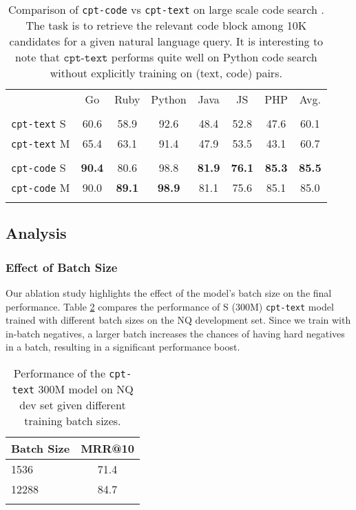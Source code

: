 \documentclass[nohyperref]{article}
\begin{document}
\begin{table}[]
\small
\setlength{\tabcolsep}{4pt}
\centering
\tabcolsep=0.11cm
\begin{tabular}{lccccccc}
 & Go & Ruby & Python & Java & JS & PHP & Avg. \\ 
\Xhline{2.5\arrayrulewidth} \\[-1.5ex]
\texttt{cpt-text} S & 60.6 & 58.9 & 92.6 & 48.4 & 52.8 & 47.6 & 60.1 \\
\texttt{cpt-text} M & 65.4 & 63.1 & 91.4 & 47.9 & 53.5 & 43.1 & 60.7 \\ 
\Xhline{1\arrayrulewidth} & \\[-1.5ex]
\texttt{cpt-code} S & \textbf{90.4} & 80.6 & 98.8 & \textbf{81.9} & \textbf{76.1} & \textbf{85.3} & \textbf{85.5} \\
\texttt{cpt-code} M & 90.0 & \textbf{89.1} & \textbf{98.9} & 81.1 & 75.6 & 85.1 & 85.0 \\
\Xhline{2.5\arrayrulewidth}
\end{tabular}
\caption{Comparison of \texttt{cpt-code} vs \texttt{cpt-text} on large scale code search \cite{codesearchnet}. The task is to retrieve the relevant code block among 10K candidates for a given natural language query. It is interesting to note that $\texttt{cpt-text}$ performs quite well on Python code search without explicitly training on (text, code) pairs.}
\label{table:large_code}
\end{table}


\subsection{Analysis}

\subsubsection{Effect of Batch Size}
\label{sec:bs}
Our ablation study highlights the effect of the model's batch size on the final performance. Table \ref{table:bs_effect} compares the performance of S (300M) \texttt{cpt-text} model trained with different batch sizes on the NQ development set. Since we train with in-batch negatives, a larger batch increases the chances of having hard negatives in a batch, resulting in a significant performance boost.

\begin{table}[]
\centering
\begin{tabular}{l|c}
\Xhline{2.5\arrayrulewidth}
Batch Size & MRR@10 \\ 
\hline  1536       & 71.4   \\ 
12288      & 84.7   \\ 
\Xhline{2.5\arrayrulewidth}
\end{tabular}
\caption{Performance of the \texttt{cpt-text} 300M model on NQ dev set given different training batch sizes.}
\label{table:bs_effect}
\end{table}
\end{document}
